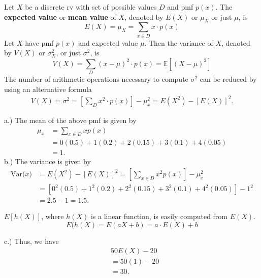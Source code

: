 \documentclass{report}
\begin{document}
 \bigbreak \noindent 
    \begin{remark}
         Let \(X\) be a discrete rv with set of possible values \(D\) and pmf \(p(x)\). The \textbf{expected value} or \textbf{mean value} of \(X\), denoted by \(E(X)\) or \(\mu_X\) or just \(\mu\), is
        \[
            E(X) = \mu_X = \sum_{x \in D} x \cdot p(x)
        \]
        \bigbreak \noindent 
                Let \( X \) have pmf \( p(x) \) and expected value \( \mu \). Then the variance of \( X \), denoted by \( V(X) \) or \( \sigma_X^2 \), or just \( \sigma^2 \), is
        \[
            V(X) = \sum_{D} (x - \mu)^2 \cdot p(x) = \mathbb{E}[(X - \mu)^2]
        \]
        \bigbreak \noindent 
        The number of arithmetic operations necessary to compute $\sigma^{2}$ can be reduced by using an alternative formula
        \begin{align*}
            V(X) = \sigma^{2} = \left[\sum_D x^{2} \cdot p(x)\right] - \mu_{x}^{2} = E(X^{2}) - [E(X)]^{2}
        .\end{align*}
 \end{remark}
 \bigbreak \noindent 
 a.) The mean of the above pmf is given by
 \begin{align*}
     \mu_{x} &= \sum_{x\in D} xp(x) \\
     &=0(0.5) + 1(0.2) + 2(0.15) + 3(0.1) + 4(0.05) \\
     &=1
 .\end{align*}
 \bigbreak \noindent 
 b.) The variance is given by
 \begin{align*}
     \text{Var($x$)} &= E(X^{2}) - [E(X)]^{2} = \left[\sum_{x\in D} x^{2}p(x) \right] - \mu_{x}^{2} \\
                     &=\left[0^{2}(0.5) + 1^{2}(0.2) + 2^{2}(0.15) + 3^{2}(0.1) + 4^{2}(0.05)\right] - 1^{2} \\
                     &=2.5-1 = 1.5
 .\end{align*}
 \bigbreak \noindent 
    \begin{remark}
     \(E[h(X)]\), where $h(X)$ is a linear function, is easily computed from \(E(X)\).
        \[
            E(h(X) = E(aX + b) = a \cdot E(X) + b
        \]
 \end{remark}
 \bigbreak \noindent 
 c.) Thus, we have
 \begin{align*}
     &50E(X) -20 \\
     &=50(1) -20 \\
     &=30
 .\end{align*}

 
 
\end{document}
